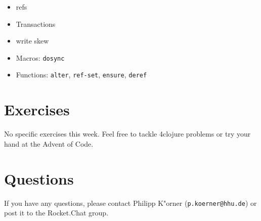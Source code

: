 \documentclass[11pt,a4paper]{article}
\begin{document}
\begin{itemize}
    \item refs 
    \item Transactions
    \item write skew
    \item Macros: \verb|dosync|
    \item Functions: \verb|alter|, \verb|ref-set|, \verb|ensure|, \verb|deref|
\end{itemize}



\section{Exercises}

No specific exercises this week. Feel free to tackle 4clojure problems or try your hand at the Advent of Code.

%
%
%
%


	\section*{Questions}
	If you have any questions, please contact Philipp K"orner (\texttt{p.koerner@hhu.de}) or post it to the Rocket.Chat group.
\end{document}
